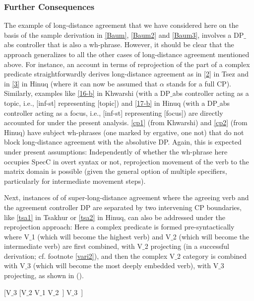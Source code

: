 \documentclass[output=paper
,modfonts
,nonflat]{langsci/langscibook}
\begin{document}
\subsubsection{Further Consequences}

The example of long-distance agreement that we have considered here on
the basis of the sample derivation in \ref{Baum}, \ref{Baum2} and
\ref{Baum3}, involves a DP$\_${abs} controller that is also a
wh-phrase. However, it should be clear that the approach generalizes
to all the other cases of long-distance agreement mentioned
above. For instance, an account in terms of reprojection of the part
of a complex predicate straightforwardly derives long-distance
agreement as in \ref{2} in Tsez and in \ref{3} in Hinuq (where it can
now be assumed that $\alpha$ stands for a full CP). Similarly,
examples like \ref{16-b} in Khwarshi (with a DP$\_${abs} controller
acting as a topic, i.e., [inf-st] representing [topic]) and \ref{17-b}
in Hinuq (with a DP$\_${abs} controller acting as a focus, i.e., [inf-st]
representing [focus]) are directly accounted for under the present
analysis. \ref{cp1} (from Khwarshi) and \ref{cp2} (from Hinuq) have
subject wh-phrases (one marked by ergative, one not) that do not block
long-distance agreement with the absolutive DP. Again, this is
expected under present assumptions: Independently of whether the
wh-phrase here occupies SpecC in overt syntax or not, reprojection
movement of the verb to the matrix domain is possible (given the
general option of multiple specifiers, particularly for intermediate
movement steps). 

Next, instances of of super-long-distance agreement where the
agreeing verb and the agreement controller DP are separated by two
intervening CP boundaries, like \ref{tsa1} in Tsakhur or \ref{tsa2} in
Hinuq, can also be addressed under the reprojection approach: Here a complex
predicate is formed pre-syntactically where V$\_$1 (which will become the
highest verb) and V$\_$2 (which will become the intermediate verb) are
first combined, with V$\_$2 projecting (in a successful derivation;
cf. footnote \ref{vari2}), and then the complex V$\_$2 category is
combined with V$\_$3 (which will become the most deeply embedded verb),
with V$\_$3 projecting, as shown in (\Next).

\ea\relax\label{ex:mueller:35} [V$\_$3 [V$\_$2 V$\_$1 V$\_$2~] V$\_$3~]\z
\end{document}
